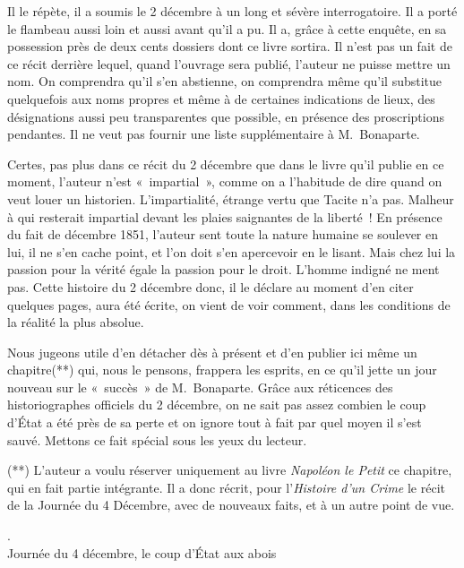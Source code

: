 \documentclass[french,twoside]{book} %
\begin{document}
{{ Il le répète, il a soumis le 2 décembre à un long et sévère interrogatoire. Il a porté le flambeau aussi loin et aussi avant qu’il a pu. Il a, grâce à cette enquête, en sa possession près de deux cents dossiers dont ce livre sortira. Il n’est pas un fait de ce récit derrière lequel, quand l’ouvrage sera publié, l’auteur ne puisse mettre un nom. On comprendra qu’il s’en abstienne, on comprendra même qu’il substitue quelquefois aux noms propres et même à de certaines indications de lieux, des désignations aussi peu transparentes que possible, en présence des proscriptions pendantes. Il ne veut pas fournir une liste supplémentaire à M. Bonaparte.\par
 Certes, pas plus dans ce récit du 2 décembre que dans le livre qu’il publie en ce moment, l’auteur n’est « impartial », comme on a l’habitude de dire quand on veut louer un historien. L’impartialité, étrange vertu que Tacite n’a pas. Malheur à qui resterait impartial devant les plaies saignantes de la liberté ! En présence du fait de décembre 1851, l’auteur sent toute la nature humaine se soulever en lui, il ne s’en cache point, et l’on doit s’en apercevoir en le lisant. Mais chez lui la passion pour la vérité égale la passion pour le droit. L’homme indigné ne ment pas. Cette histoire du 2 décembre donc, il le déclare au moment d’en citer quelques pages, aura été écrite, on vient de voir comment, dans les conditions de la réalité la plus absolue.\par
 Nous jugeons utile d’en détacher dès à présent et d’en publier ici même un chapitre(**) qui, nous le pensons, frappera les esprits, en ce qu’il jette un jour nouveau sur le « succès » de M. Bonaparte. Grâce aux réticences des historiographes officiels du 2 décembre, on ne sait pas assez combien le coup d’État a été près de sa perte et on ignore tout à fait par quel moyen il s’est sauvé. Mettons ce fait spécial sous les yeux du lecteur.\par
 (**) L’auteur a voulu réserver uniquement au livre \emph{Napoléon le Petit} ce chapitre, qui en fait partie intégrante. Il a donc récrit, pour l’\emph{Histoire d’un Crime} le récit de la Journée du 4 Décembre, avec de nouveaux faits, et à un autre point de vue.
}. \\
Journée du 4 décembre, le coup d’État aux abois}
\end{document}
